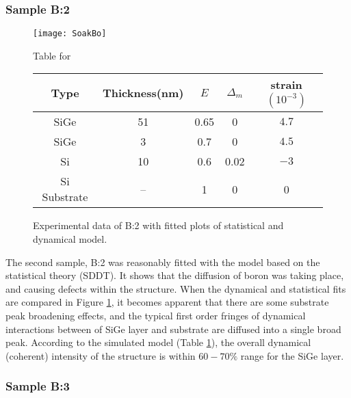 \subsubsection{Sample B:2}
%
\begin{figure}[ht]%
\caption{Experimental data of B:2 with fitted plots of statistical and dynamical model.}
\label{B2:fig}
\begin{minipage}{\linewidth}
\texttt{[image: SoakBo]}
\end{minipage}
\begin{minipage}{\linewidth}
\vspace{10pt}
\centering
Table for \\
\begin{tabular}[htbp]{@{}c|cccc@{}}
    \hline
  Type & Thickness(nm) & $E$ & $\Delta_m$ & strain $(10^{-3})$ \\
    \hline
  SiGe & 51 & 0.65 & 0 & $4.7 $  \\
  SiGe & 3 & 0.7 & 0 & $4.5 $  \\
  Si   & 10 & 0.6 & 0.02 & $-3$ \\
  Si Substrate & -- & 1 & 0 & 0
  \end{tabular}
  \end{minipage}
\end{figure}
%
The second sample, B:2 was reasonably fitted with the model based on the statistical theory (SDDT).  It shows that the diffusion of boron was taking place, and causing defects within the structure.  When the dynamical and statistical fits are compared in Figure \ref{B2:fig}, it becomes apparent that there are some substrate peak broadening effects, and the typical first order fringes of dynamical interactions between of SiGe layer and substrate are diffused into a single broad peak.  According to the simulated model (Table \ref{B2:fig}), the overall dynamical (coherent) intensity of the structure is within $60-70\%$ range for the SiGe layer.


\subsubsection{Sample B:3}


